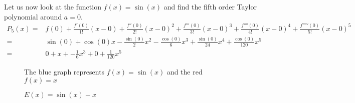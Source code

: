 \documentclass[main.tex]{subfiles}
\begin{document}
\begin{example}
Let us now look at the function $f(x)=\sin(x)$ and find the fifth order Taylor polynomial around $a=0$.
\begin{align}
P_5(x) =& f(0) + \frac{f'(0)}{1!}(x-0) + \frac{f''(0)}{2!}(x-0)^2 + \frac{f'''(0)}{3!}(x-0)^3 + \frac{f''''(0)}{4!}(x-0)^4 + \frac{f'''''(0)}{5!}(x-0)^5 \\
=& \sin(0) + \cos(0)x - \frac{\sin(0)}{2}x^2-\frac{\cos(0)}{6}x^3+\frac{\sin(0)}{24}x^4+\frac{\cos(0)}{120}x^5 \\
=& 0 + x + -\frac{1}{6}x^3+0+\frac{1}{120}x^5
\end{align}

\begin{figure}
\begin{center}
\begin{minipage}[t]{0.45\linewidth}
\caption{The blue graph represents $f(x) = \sin(x)$ and the red $f(x)= x$}
\end{minipage}
\quad
\begin{minipage}[t]{0.45\linewidth}
\caption{$E(x) = \sin(x)-x$}
\end{minipage}
\end{center}
\end{figure}

\end{example}
\end{document}
